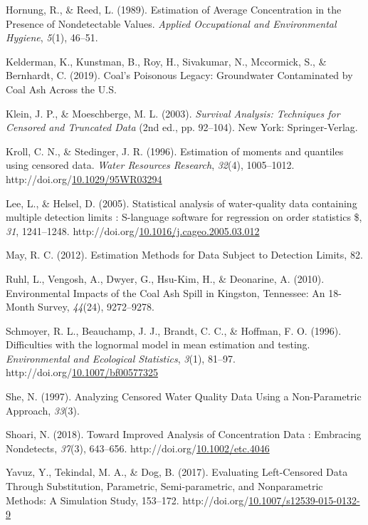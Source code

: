 \documentclass[12pt, twoside]{amherstthesis}
\newenvironment{CSLReferences}%
  {}%
  {\par}
\begin{document}
\begin{CSLReferences}{1}{0}
\leavevmode\hypertarget{ref-Hornung1989}{}%
Hornung, R., \& Reed, L. (1989). {Estimation of Average Concentration in the Presence of Nondetectable Values}. \emph{Applied Occupational and Environmental Hygiene}, \emph{5}(1), 46--51.

\leavevmode\hypertarget{ref-Kelderman2019}{}%
Kelderman, K., Kunstman, B., Roy, H., Sivakumar, N., Mccormick, S., \& Bernhardt, C. (2019). {Coal's Poisonous Legacy: Groundwater Contaminated by Coal Ash Across the U.S.}

\leavevmode\hypertarget{ref-Klein2003}{}%
Klein, J. P., \& Moeschberge, M. L. (2003). \emph{{Survival Analysis: Techniques for Censored and Truncated Data}} (2nd ed., pp. 92--104). New York: Springer-Verlag.

\leavevmode\hypertarget{ref-Kroll1996}{}%
Kroll, C. N., \& Stedinger, J. R. (1996). {Estimation of moments and quantiles using censored data}. \emph{Water Resources Research}, \emph{32}(4), 1005--1012. http://doi.org/\href{https://doi.org/10.1029/95WR03294}{10.1029/95WR03294}

\leavevmode\hypertarget{ref-Lee2005}{}%
Lee, L., \& Helsel, D. (2005). {Statistical analysis of water-quality data containing multiple detection limits : S-language software for regression on order statistics {\$}}, \emph{31}, 1241--1248. http://doi.org/\href{https://doi.org/10.1016/j.cageo.2005.03.012}{10.1016/j.cageo.2005.03.012}

\leavevmode\hypertarget{ref-May2012}{}%
May, R. C. (2012). {Estimation Methods for Data Subject to Detection Limits}, 82.

\leavevmode\hypertarget{ref-Ruhl2010}{}%
Ruhl, L., Vengosh, A., Dwyer, G., Hsu-Kim, H., \& Deonarine, A. (2010). {Environmental Impacts of the Coal Ash Spill in Kingston, Tennessee: An 18-Month Survey}, \emph{44}(24), 9272--9278.

\leavevmode\hypertarget{ref-Schmoyer1996}{}%
Schmoyer, R. L., Beauchamp, J. J., Brandt, C. C., \& Hoffman, F. O. (1996). {Difficulties with the lognormal model in mean estimation and testing}. \emph{Environmental and Ecological Statistics}, \emph{3}(1), 81--97. http://doi.org/\href{https://doi.org/10.1007/bf00577325}{10.1007/bf00577325}

\leavevmode\hypertarget{ref-She1997}{}%
She, N. (1997). {Analyzing Censored Water Quality Data Using a Non-Parametric Approach}, \emph{33}(3).

\leavevmode\hypertarget{ref-Shoari2018}{}%
Shoari, N. (2018). {Toward Improved Analysis of Concentration Data : Embracing Nondetects}, \emph{37}(3), 643--656. http://doi.org/\href{https://doi.org/10.1002/etc.4046}{10.1002/etc.4046}

\leavevmode\hypertarget{ref-Yavuz2017}{}%
Yavuz, Y., Tekindal, M. A., \& Dog, B. (2017). {Evaluating Left-Censored Data Through Substitution, Parametric, Semi-parametric, and Nonparametric Methods: A Simulation Study}, 153--172. http://doi.org/\href{https://doi.org/10.1007/s12539-015-0132-9}{10.1007/s12539-015-0132-9}

\end{CSLReferences}
\end{document}
